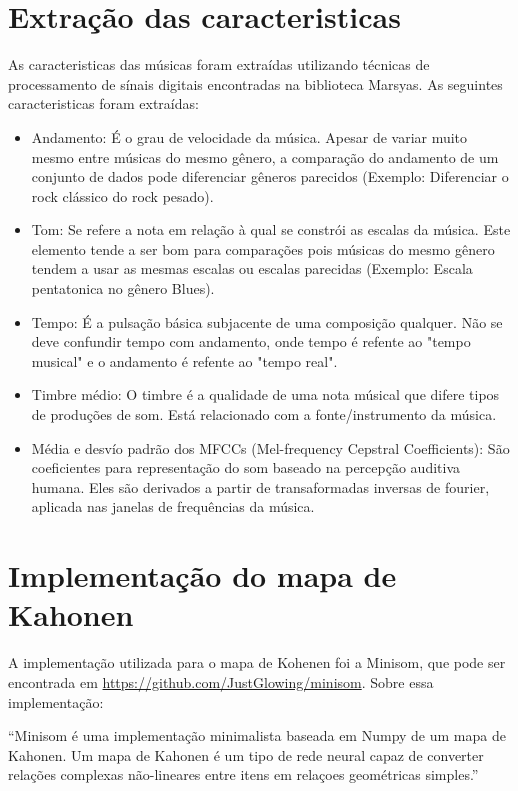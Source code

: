 \documentclass[journal]{IEEEtran}
\begin{document}
\section{Extração das caracteristicas}
As caracteristicas das músicas foram extraídas utilizando técnicas de processamento de sínais digitais encontradas na biblioteca Marsyas. As seguintes caracteristicas foram extraídas:
\begin{itemize}
	\item Andamento: É o grau de velocidade da música. Apesar de variar muito mesmo entre músicas do mesmo gênero, a comparação do andamento de um conjunto de dados pode diferenciar gêneros parecidos (Exemplo: Diferenciar o rock clássico do rock pesado).
	\item Tom: Se refere a nota em relação à qual se constrói as escalas da música. Este elemento tende a ser bom para comparações pois músicas do mesmo gênero tendem a usar as mesmas escalas ou escalas parecidas (Exemplo: Escala pentatonica no gênero Blues).
	\item Tempo: É a pulsação básica subjacente de uma composição qualquer. Não se deve confundir tempo com andamento, onde tempo é refente ao "tempo musical" e o andamento é refente ao "tempo real".
	\item Timbre médio: O timbre é a qualidade de uma nota músical que difere tipos de produções de som. Está relacionado com a fonte/instrumento da música.
	\item Média e desvío padrão dos MFCCs (Mel-frequency Cepstral Coefficients): São coeficientes para representação do som baseado na percepção auditiva humana. Eles são derivados a partir de transaformadas inversas de fourier, aplicada nas janelas de frequências da música.
\end{itemize}

\section{Implementação do mapa de Kahonen}
A implementação utilizada para o mapa de Kohenen foi a Minisom, que pode ser encontrada em \href{https://github.com/JustGlowing/minisom}{https://github.com/JustGlowing/minisom}. Sobre essa implementação:
\begin{center}
``Minisom é uma implementação minimalista baseada em Numpy de um mapa de Kahonen. Um mapa de Kahonen é um tipo de rede neural capaz de converter relações complexas não-lineares entre itens em relaçoes geométricas simples.''
\end{center}
\end{document}
